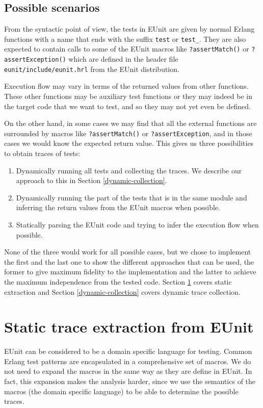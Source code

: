 \documentclass[]{sigplanconf}
\begin{document}
\subsection{Possible scenarios}

From the syntactic point of view, the tests in EUnit are given by
normal Erlang functions with a name that ends with the suffix \texttt{test}
or \texttt{test\_}. They are also expected to contain calls to some of the EUnit macros
like \texttt{?assertMatch()} or \texttt{?assertException()} which are
defined in the header file \texttt{eunit/include/eunit.hrl} from the
EUnit distribution.

Execution flow may vary in terms of the returned values
from other functions. These other functions may be auxiliary test functions or they may indeed be in the target code that we want to test,
and so they may not yet even be
defined.

On the other hand, in some cases we may find that all the external
functions are surrounded by macros like \texttt{?assertMatch()} or
\texttt{?assertException}, and in those cases we would know the
expected return value.
This gives us three possibilities to obtain traces of tests:
\begin{enumerate}
 \item Dynamically running all tests and collecting the traces. We describe our approach to this in Section \ref{dynamic-collection}.
 \item Dynamically running the part of the tests that is in the same
module and inferring the return values from the EUnit macros when
possible.
 \item Statically parsing the EUnit code and trying to infer the
execution flow when possible.
\end{enumerate}
None of the three would work for all possible cases, but
 we chose to implement the first and the last one to show the different approaches that can be used, the former to give maximum fidelity to the implementation and the latter to achieve the maximum independence from the tested code. Section \ref{static} covers static extraction and Section \ref{dynamic-collection} covers dynamic trace collection.

\section{Static trace extraction from EUnit}
\label{static}

EUnit can be considered to be a domain specific language for testing. Common Erlang test patterns are encapsulated in a comprehensive set of macros. We do not need to expand the macros in the same way as they are define in EUnit. In fact, this expansion makes the analysis harder, since we use the semantics of the macros (the domain specific language) to be able to determine the possible traces.
\end{document}
